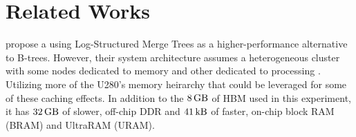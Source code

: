 \section{Related Works}

\citeauthor{dlsm} propose a using Log-Structured Merge Trees as a higher-performance alternative to B-trees. However, their system architecture assumes a heterogeneous cluster with some nodes dedicated to memory and other dedicated to processing \cite{dlsm}. Utilizing more of the U280's memory heirarchy that could be leveraged for some of these caching effects. In addition to the $\SI{8}{\giga\byte}$ of HBM used in this experiment, it has $\SI{32}{\giga\byte}$ of slower, off-chip DDR and $\SI{41}{\kilo\byte}$ of faster, on-chip block RAM (BRAM) and UltraRAM (URAM).
